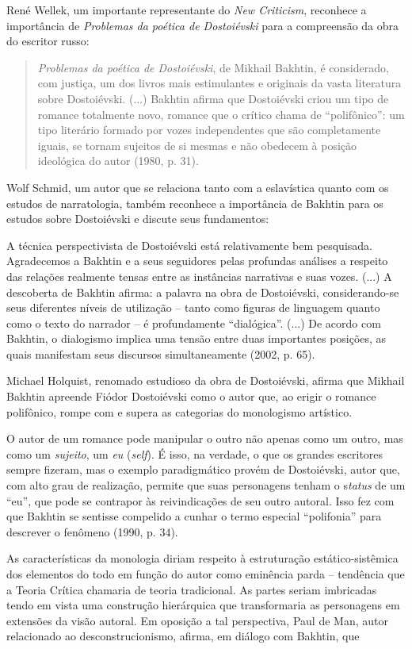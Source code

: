 René Wellek, um importante representante do \emph{New Criticism},
reconhece a importância de \emph{Problemas da poética de Dostoiévski}
para a compreensão da obra do escritor russo:

\begin{quote}
\emph{Problemas da poética de Dostoiévski}, de Mikhail Bakhtin, é
considerado, com justiça, um dos livros mais estimulantes e originais da
vasta literatura sobre Dostoiévski. (...) Bakhtin afirma que Dostoiévski
criou um tipo de romance totalmente novo, romance que o crítico chama de
``polifônico'': um tipo literário formado por vozes independentes que
são completamente iguais, se tornam sujeitos de si mesmas e não obedecem
à posição ideológica do autor (1980, p. 31).
\end{quote}

Wolf Schmid, um autor que se relaciona tanto com a eslavística quanto
com os estudos de narratologia, também reconhece a importância de
Bakhtin para os estudos sobre Dostoiévski e discute seus fundamentos:

A técnica perspectivista de Dostoiévski está relativamente bem
pesquisada. Agradecemos a Bakhtin e a seus seguidores pelas profundas
análises a respeito das relações realmente tensas entre as instâncias
narrativas e suas vozes. (...) A descoberta de Bakhtin afirma: a palavra
na obra de Dostoiévski, considerando-se seus diferentes níveis de
utilização -- tanto como figuras de linguagem quanto como o texto do
narrador -- é profundamente ``dialógica''. (...) De acordo com Bakhtin,
o dialogismo implica uma tensão entre duas importantes posições, as
quais manifestam seus discursos simultaneamente (2002, p. 65).

Michael Holquist, renomado estudioso da obra de Dostoiévski, afirma que
Mikhail Bakhtin apreende Fiódor Dostoiévski como o autor que, ao erigir
o romance polifônico, rompe com e supera as categorias do monologismo
artístico.

O autor de um romance pode manipular o outro não apenas como um outro,
mas como um \emph{sujeito}, um \emph{eu} (\emph{self}). É isso, na
verdade, o que os grandes escritores sempre fizeram, mas o exemplo
paradigmático provém de Dostoiévski, autor que, com alto grau de
realização, permite que suas personagens tenham o s\emph{tatus} de um
``eu'', que pode se contrapor às reivindicações de seu outro autoral.
Isso fez com que Bakhtin se sentisse compelido a cunhar o termo especial
``polifonia'' para descrever o fenômeno (1990, p. 34).

As características da monologia diriam respeito à estruturação
estático-sistêmica dos elementos do todo em função do autor como
eminência parda -- tendência que a Teoria Crítica chamaria de teoria
tradicional. As partes seriam imbricadas tendo em vista uma construção
hierárquica que transformaria as personagens em extensões da visão
autoral. Em oposição a tal perspectiva, Paul de Man, autor relacionado
ao desconstrucionismo, afirma, em diálogo com Bakhtin, que

